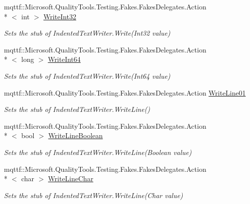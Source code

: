 \begin{DoxyCompactItemize}
mqttf\-::\-Microsoft.\-Quality\-Tools.\-Testing.\-Fakes.\-Fakes\-Delegates.\-Action\\*
$<$ int $>$ \hyperlink{class_system_1_1_code_dom_1_1_compiler_1_1_fakes_1_1_stub_indented_text_writer_a10a90357f7d15fb8243d34942cfe71c1}{Write\-Int32}
\begin{DoxyCompactList}\small\item\em Sets the stub of Indented\-Text\-Writer.\-Write(\-Int32 value)\end{DoxyCompactList}\item 
mqttf\-::\-Microsoft.\-Quality\-Tools.\-Testing.\-Fakes.\-Fakes\-Delegates.\-Action\\*
$<$ long $>$ \hyperlink{class_system_1_1_code_dom_1_1_compiler_1_1_fakes_1_1_stub_indented_text_writer_a2fa310e9242551fd667dd839b5177984}{Write\-Int64}
\begin{DoxyCompactList}\small\item\em Sets the stub of Indented\-Text\-Writer.\-Write(\-Int64 value)\end{DoxyCompactList}\item 
mqttf\-::\-Microsoft.\-Quality\-Tools.\-Testing.\-Fakes.\-Fakes\-Delegates.\-Action \hyperlink{class_system_1_1_code_dom_1_1_compiler_1_1_fakes_1_1_stub_indented_text_writer_a9243ad973a6a04dea99ce17c76acbbe6}{Write\-Line01}
\begin{DoxyCompactList}\small\item\em Sets the stub of Indented\-Text\-Writer.\-Write\-Line()\end{DoxyCompactList}\item 
mqttf\-::\-Microsoft.\-Quality\-Tools.\-Testing.\-Fakes.\-Fakes\-Delegates.\-Action\\*
$<$ bool $>$ \hyperlink{class_system_1_1_code_dom_1_1_compiler_1_1_fakes_1_1_stub_indented_text_writer_a81e13506f150fe972864ea1c0ac7313f}{Write\-Line\-Boolean}
\begin{DoxyCompactList}\small\item\em Sets the stub of Indented\-Text\-Writer.\-Write\-Line(\-Boolean value)\end{DoxyCompactList}\item 
mqttf\-::\-Microsoft.\-Quality\-Tools.\-Testing.\-Fakes.\-Fakes\-Delegates.\-Action\\*
$<$ char $>$ \hyperlink{class_system_1_1_code_dom_1_1_compiler_1_1_fakes_1_1_stub_indented_text_writer_af91ea73c558a75fb23cfa6e8846e21cf}{Write\-Line\-Char}
\begin{DoxyCompactList}\small\item\em Sets the stub of Indented\-Text\-Writer.\-Write\-Line(\-Char value)\end{DoxyCompactList}\item 

\end{DoxyCompactItemize}
